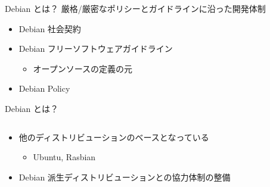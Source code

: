 \documentclass[cjk,c,squeeze,shrink,dvipdfmx,12pt]{beamer}
\begin{document}


\begin{frame}[fragile]{Debian とは？}
  厳格/厳密なポリシーとガイドラインに沿った開発体制
  \begin{itemize}
  \item Debian 社会契約
  \item Debian フリーソフトウェアガイドライン
    \begin{itemize}
    \item オープンソースの定義の元
    \end{itemize}
  \item Debian Policy
  \end{itemize}
\end{frame}

\begin{frame}[fragile]{Debian とは？}
  \begin{columns}
    \begin{column}{.58\paperwidth}
      \begin{itemize}
      \item
        他のディストリビューションのベースとなっている
	\begin{itemize}
	  \item Ubuntu, Rasbian
	\end{itemize}
      \item
        Debian 派生ディストリビューションとの協力体制の整備
      \end{itemize}
    \end{column}
    \begin{column}{.4\paperwidth}
      \centering
    \end{column}
  \end{columns}
\end{frame}

%
\end{document}
